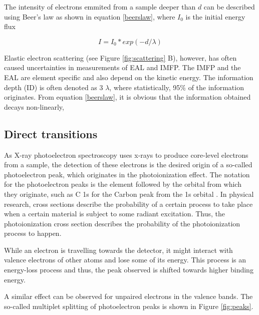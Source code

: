 The intensity of electrons emmited from a sample deeper than $d$ can be described using Beer's law as shown in equation \ref{beerslaw}, where $I_{0}$ is the initial energy flux

\begin{equation}
\label{beerslaw}
    I = I_{0} * exp(-d/\lambda)
\end{equation}

Elastic electron scattering (see Figure \ref{fig:scattering} B), however, has often caused uncertainties in measurements of EAL and IMFP. The IMFP and the EAL are element specific and also depend on the kinetic energy. 
The information depth (ID) is often denoted as 3 $\lambda$, where statistically, 95\% of the information originates. From equation \ref{beerslaw}, it is obvious that the information obtained decays non-linearly, 

\subsection{Direct transitions}
As X-ray photoelectron spectroscopy uses x-rays to produce core-level electrons from a sample, the detection of these electrons is the desired origin of a so-called photoelectron peak, which originates in the photoionization effect. The notation for the photoelectron peaks is the element followed by the orbital from which they originate, such as C 1s for the Carbon peak from the 1s orbital \cite{stevie_introduction_2020}. In physical research, cross sections describe the probability of a certain process to take place when a certain material is subject to some radiant excitation. Thus, the photoionization cross section describes the probability of the photoionization process to happen. 

While an electron is travelling towards the detector, it might interact with valence electrons of other atoms and lose some of its energy. This process is an energy-loss process and thus, the peak observed is shifted towards higher binding energy.

A similar effect can be observed for unpaired electrons in the valence bands. The so-called multiplet splitting of photoelectron peaks is shown in Figure \ref{fig:peaks}.


